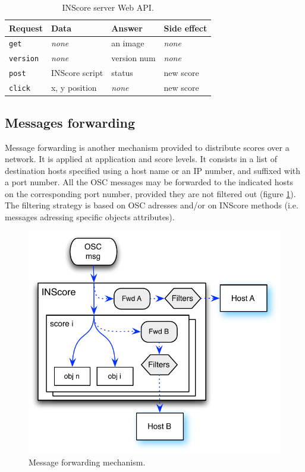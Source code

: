 \documentclass{article}
\newcommand{\code}[1]		{{\small \texttt{#1}}}
\newcommand{\none}			{ \textit{none}  }
\begin{document}
\begin{table}[h]
 \begin{center}
 \begin{tabular}{|l|l|l|l|}
  \hline
  Request & Data & Answer & Side effect\\
  \hline
  \code{get}  & \none & an image  & \none \\
  \code{version}  & \none & version num & \none \\
  \hline
  \code{post}  & INScore script & status & new score \\
  \code{click}  & x, y position & \none & new score \\
  \hline
 \end{tabular}
\end{center}
 \caption{INScore server Web API.}
 \label{tab:protocol}
\end{table}

\subsection{Messages forwarding}\label{forward}

Message forwarding is another mechanism provided to distribute scores over a network. It is applied at application and score levels. It consists in a list of destination hosts specified using a host name or an IP number, and suffixed with a port number. All the OSC messages may be forwarded to the indicated hosts on the corresponding port number, provided they are not filtered out (figure \ref{fig:forward}).
The filtering strategy is based on OSC adresses and/or on INScore methods (i.e. messages adressing specific objects attributes). 

\begin{figure}[h]
\centering
\includegraphics[width=0.90\columnwidth]{img/forward}
\caption{Message forwarding mechanism.
\label{fig:forward}}
\end{figure}
\end{document}
